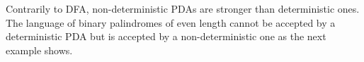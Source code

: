 

\setcounter{section}{6}
\setcounter{subsection}{1}
\setcounter{dfn}{4}


Contrarily to DFA, non-deterministic PDAs are stronger than deterministic ones.
The language of binary palindromes of even length cannot be accepted by a deterministic PDA
but is accepted by a non-deterministic one as the next example shows.


